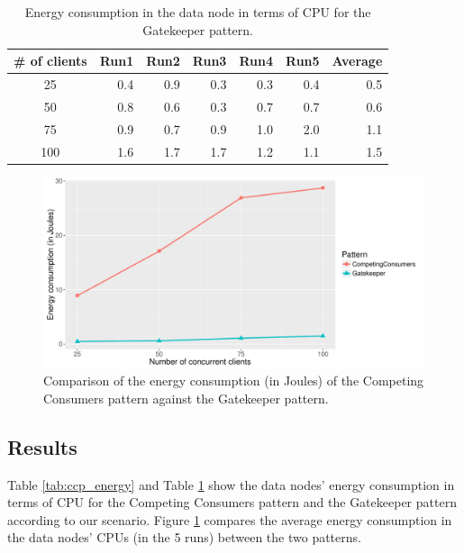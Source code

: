\documentclass{article}
\begin{document}
\begin{table}[!]
    \centering
    \caption{Energy consumption in the data node in terms of CPU for the Gatekeeper pattern.}
    \label{tab:gatekeeper_energy}
    \begin{tabular}{|c|r|r|r|r|r|r|}
        \hline
        \textbf{\# of clients} & \textbf{Run1} & \textbf{Run2} & \textbf{Run3} & \textbf{Run4} & \textbf{Run5} & \textbf{Average}\\ \hline
        25 & 0.4 & 0.9 & 0.3 & 0.3 & 0.4 & 0.5 \\ \hline 
        50 & 0.8 & 0.6 & 0.3 & 0.7 & 0.7 & 0.6 \\ \hline 
        75 & 0.9 & 0.7 & 0.9 & 1.0 & 2.0 & 1.1 \\ \hline 
        100 & 1.6 & 1.7 & 1.7 & 1.2 & 1.1 & 1.5 \\ \hline 
	\end{tabular}
\end{table}

\begin{figure}[t]
    \centering
        \includegraphics[width = \columnwidth]{images/energy.pdf}
    \caption{Comparison of the energy consumption (in Joules) of the Competing Consumers pattern against the Gatekeeper pattern.}
    \label{fig:energy}
\end{figure}


\subsection{Results}
Table \ref{tab:ccp_energy} and Table \ref{tab:gatekeeper_energy} show the data nodes' energy consumption in terms of CPU for the Competing Consumers pattern and the Gatekeeper pattern according to our scenario. Figure \ref{fig:energy} compares the average energy consumption in the data nodes' CPUs (in the 5 runs) between the two patterns.\\
\end{document}
